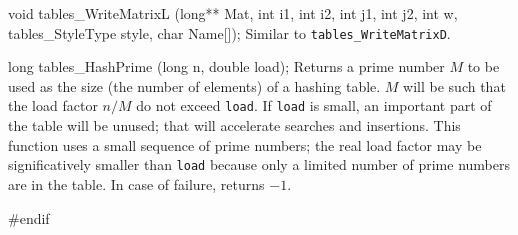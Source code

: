 void tables_WriteMatrixL (long** Mat, int i1, int i2, int j1, int j2, int w,
                          tables_StyleType style, char Name[]);
\endcode
 \tab Similar to {\tt tables\_WriteMatrixD}.
 \endtab
\code


long tables_HashPrime (long n, double load);
\endcode
  \tab Returns a prime number $M$ to be used as the size 
   (the number of elements) of a hashing table.
   $M$ will be such that the load factor $n/M$ do not exceed {\tt load}.
   If {\tt load} is small, an important part of the table will be unused; that
   will accelerate searches and insertions.
   This function uses a small sequence of prime numbers; the real load factor
   may be significatively smaller than {\tt load} because only a limited
   number of prime numbers are in the table. In case of failure, returns $-1$.
 \endtab
\code\hide

#endif
\endhide
\endcode
